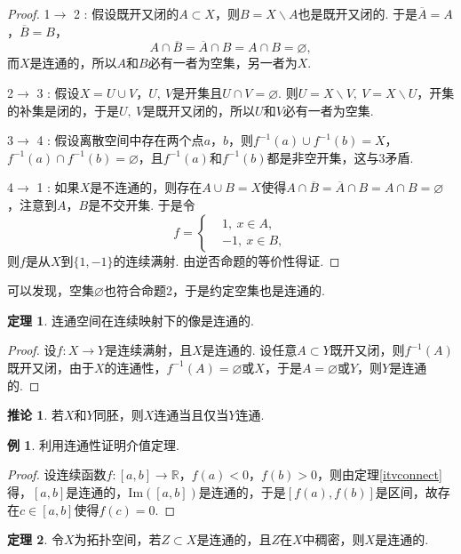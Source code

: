 \documentclass[12pt]{ctexart}
\theoremstyle{definition}
\newtheorem{theorem}{定理}
\newtheorem{corollary}{推论}
\newtheorem{example}{例}
\theoremstyle{plain}
\begin{document}
	\begin{proof}
		1$\to$ 2 : 假设既开又闭的$A\subset X$，则$B=X\backslash A$也是既开又闭的. 于是$\overline{A}=A$，$\overline{B}=B$，
		$$A\cap\overline{B}=\overline{A}\cap B=A\cap B=\varnothing,$$
		而$X$是连通的，所以$A$和$B$必有一者为空集，另一者为$X$.
		
		2$\to$ 3 : 假设$X=U\cup V$，$U,\ V$是开集且$U\cap V=\varnothing$. 则$U=X\backslash V,\ V=X\backslash U$，开集的补集是闭的，于是$U,\ V$是既开又闭的，所以$U$和$V$必有一者为空集.
		
		3$\to$ 4 : 假设离散空间中存在两个点$a$，$b$，则$f^{-1}(a)\cup f^{-1}(b)=X$，$f^{-1}(a)\cap f^{-1}(b)=\varnothing$，且$f^{-1}(a)$和$f^{-1}(b)$都是非空开集，这与3矛盾.
		
		4$\to$ 1 : 如果$X$是不连通的，则存在$A\cup B=X$使得$A\cap\overline{B}=\overline{A}\cap B=A\cap B=\varnothing$，注意到$A$，$B$是不交开集. 于是令
		\begin{equation*}
			f=\left\{
			\begin{aligned}
				&1,\ x\in A,\\
				&-1,\ x\in B,
			\end{aligned}
			\right.
		\end{equation*}
		则$f$是从$X$到$\{1,-1\}$的连续满射. 由逆否命题的等价性得证.
	\end{proof}
	可以发现，空集$\varnothing$也符合命题2，于是约定空集也是连通的.
	\begin{theorem}
		连通空间在连续映射下的像是连通的.
	\end{theorem}
	\begin{proof}
		设$f:X\to Y$是连续满射，且$X$是连通的. 设任意$A\subset Y$既开又闭，则$f^{-1}(A)$既开又闭，由于$X$的连通性，$f^{-1}(A)=\varnothing$或$X$，于是$A=\varnothing$或$Y$，则$Y$是连通的.
	\end{proof}
	\begin{corollary}
		若$X$和$Y$同胚，则$X$连通当且仅当$Y$连通.
	\end{corollary}
	\begin{example}
		利用连通性证明介值定理.
	\end{example}
	\begin{proof}
		设连续函数$f:\left[a,b\right]\to\mathbb{R}$，$f(a)<0$，$f(b)>0$，则由定理\ref{itvconnect}得，$\left[a,b\right]$是连通的，$\mathrm{Im}(\left[a,b\right])$是连通的，于是$\left[f(a),f(b)\right]$是区间，故存在$c\in\left[a,b\right]$使得$f(c)=0$.
	\end{proof}
	\begin{theorem}
		令$X$为拓扑空间，若$Z\subset X$是连通的，且$Z$在$X$中稠密，则$X$是连通的.
	\end{theorem}
\end{document}
